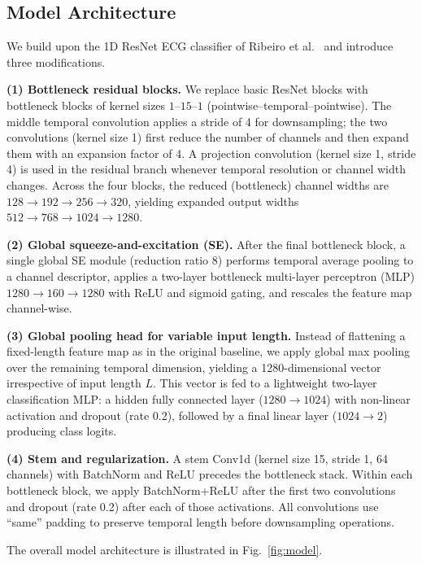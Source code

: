 \subsection{Model Architecture}
\label{subsec:model}


We build upon the 1D ResNet ECG classifier of Ribeiro et al.~\cite{ribeiro2020automatic} and introduce three modifications.

\textbf{(1) Bottleneck residual blocks.} We replace basic ResNet blocks with bottleneck blocks of kernel sizes $1$–$15$–$1$ (pointwise--temporal--pointwise). The middle temporal convolution applies a stride of 4 for downsampling; the two convolutions (kernel size 1) first reduce the number of channels and then expand them with an expansion factor of 4. A projection convolution (kernel size 1, stride 4) is used in the residual branch whenever temporal resolution or channel width changes. Across the four blocks, the reduced (bottleneck) channel widths are $128 \to 192 \to 256 \to 320$, yielding expanded output widths $512 \to 768 \to 1024 \to 1280$.

\textbf{(2) Global squeeze-and-excitation (SE).} After the final bottleneck block, a single global SE module (reduction ratio 8) \cite{hu2018senet} performs temporal average pooling to a channel descriptor, applies a two-layer bottleneck multi-layer perceptron (MLP) $1280 \to 160 \to 1280$ with ReLU and sigmoid gating, and rescales the feature map channel-wise.

\textbf{(3) Global pooling head for variable input length.} Instead of flattening a fixed-length feature map as in the original baseline, we apply global max pooling over the remaining temporal dimension, yielding a 1280-dimensional vector irrespective of input length $L$. This vector is fed to a lightweight two-layer classification MLP: a hidden fully connected layer ($1280 \to 1024$) with non-linear activation and dropout (rate 0.2), followed by a final linear layer ($1024 \to 2$) producing class logits.

\textbf{(4) Stem and regularization.} A stem Conv1d (kernel size 15, stride 1, 64 channels) with BatchNorm and ReLU precedes the bottleneck stack. Within each bottleneck block, we apply BatchNorm+ReLU after the first two convolutions and dropout (rate 0.2) after each of those activations. All convolutions use “same” padding to preserve temporal length before downsampling operations.

The overall model architecture is illustrated in Fig.~\ref{fig:model}.



